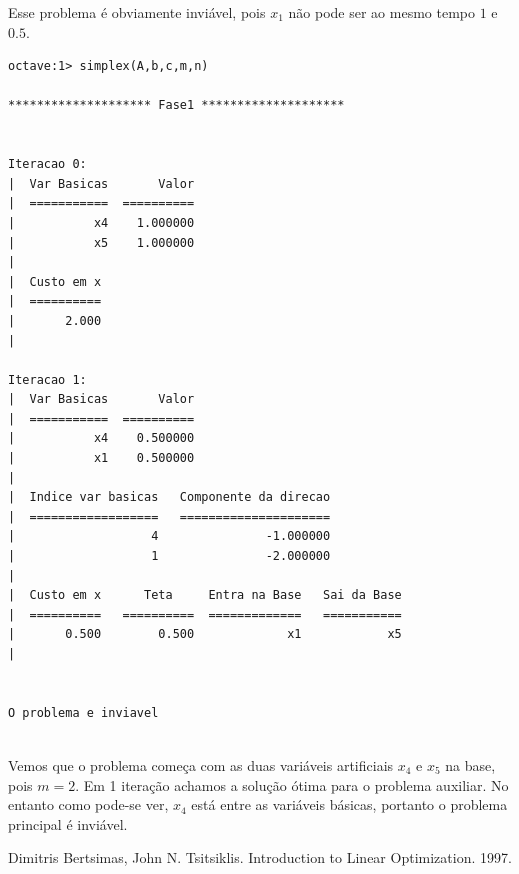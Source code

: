 \documentclass[12pt]{article}
\begin{document}
	\lstset {firstnumber=1}	
	
	Esse problema é obviamente inviável, pois $x_1$ não pode ser ao mesmo tempo $1$ e $0.5$. 
	\begin{lstlisting}[style=term]
octave:1> simplex(A,b,c,m,n)

******************** Fase1 ********************


Iteracao 0:
|  Var Basicas	     Valor
|  ===========	==========
|           x4	  1.000000
|           x5	  1.000000
|  
|  Custo em x
|  ==========
|       2.000
|  

Iteracao 1:
|  Var Basicas	     Valor
|  ===========	==========
|           x4	  0.500000
|           x1	  0.500000
|  
|  Indice var basicas	Componente da direcao
|  ==================	=====================
|                   4	            -1.000000
|                   1	            -2.000000
|  
|  Custo em x	   Teta   	Entra na Base	Sai da Base
|  ==========	==========	=============	===========
|       0.500	     0.500	           x1	         x5
|  


O problema e inviavel


	\end{lstlisting}
	Vemos que o problema começa com as duas variáveis artificiais $x_4$ e $x_5$ na base, pois $m = 2$. Em 1 iteração achamos a solução ótima para o problema auxiliar. No entanto como pode-se ver, $x_4$ está entre as variáveis básicas, portanto o problema principal é inviável.

    

\newpage
\begin{thebibliography}{9}
 Dimitris Bertsimas, John N. Tsitsiklis. Introduction to Linear Optimization. 1997.
\end{thebibliography}
\end{document}
